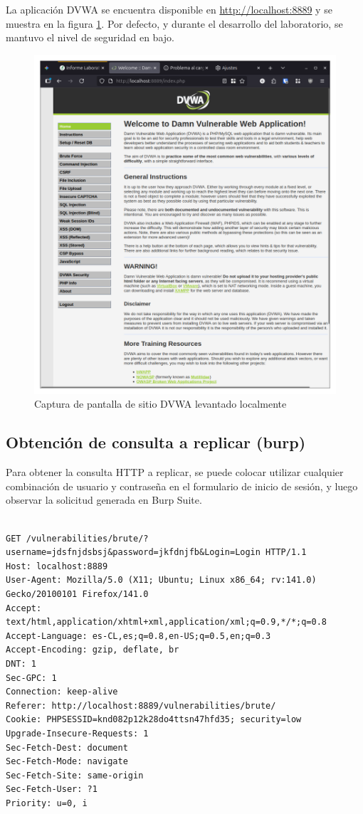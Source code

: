 \documentclass[letterpaper,12pt]{article}
\let\origsubsection\subsection
\renewcommand{\subsection}{\FloatBarrier\origsubsection}
\begin{document}
La aplicación DVWA se encuentra disponible en \url{http://localhost:8889} y se muestra en la figura \ref{fig:dvwastartscreen}. Por defecto, y durante el desarrollo del laboratorio, se mantuvo el nivel de seguridad en bajo.
\begin{figure}
    \centering
    \includegraphics[width=1\linewidth]{levanteyredireccione/Captura desde 2025-10-01 23-14-34.png}
    \caption{Captura de pantalla de sitio DVWA levantado localmente}
    \label{fig:dvwastartscreen}
\end{figure}
\subsection{Obtención de consulta a replicar (burp)}
Para obtener la consulta HTTP a replicar, se puede colocar utilizar cualquier combinación de usuario y contraseña en el formulario de inicio de sesión, y luego observar la solicitud generada en Burp Suite.
\begin{verbatim}

GET /vulnerabilities/brute/?username=jdsfnjdsbsj&password=jkfdnjfb&Login=Login HTTP/1.1
Host: localhost:8889
User-Agent: Mozilla/5.0 (X11; Ubuntu; Linux x86_64; rv:141.0) Gecko/20100101 Firefox/141.0
Accept: text/html,application/xhtml+xml,application/xml;q=0.9,*/*;q=0.8
Accept-Language: es-CL,es;q=0.8,en-US;q=0.5,en;q=0.3
Accept-Encoding: gzip, deflate, br
DNT: 1
Sec-GPC: 1
Connection: keep-alive
Referer: http://localhost:8889/vulnerabilities/brute/
Cookie: PHPSESSID=knd082p12k28do4ttsn47hfd35; security=low
Upgrade-Insecure-Requests: 1
Sec-Fetch-Dest: document
Sec-Fetch-Mode: navigate
Sec-Fetch-Site: same-origin
Sec-Fetch-User: ?1
Priority: u=0, i


\end{verbatim}
\end{document}
